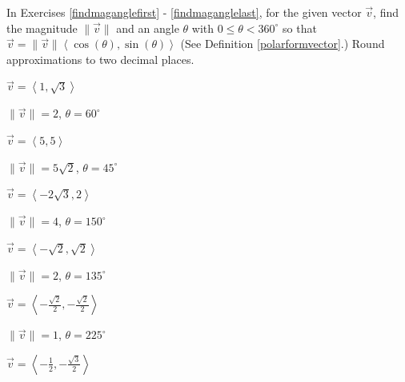 \documentclass{ximera}
\begin{document}
\begin{question}
In Exercises \ref{findmaganglefirst} - \ref{findmaganglelast}, for the given vector $\overrightarrow{v}$, find the magnitude $\|\overrightarrow{v}\|$ and an angle $\theta$ with $0 \leq \theta < 360^{\circ}$ so that $\overrightarrow{v} = \|\overrightarrow{v}\| \left<\cos(\theta), \sin(\theta) \right>$ (See Definition \ref{polarformvector}.)  Round approximations to two decimal places.

\begin{problem} \label{findmaganglefirst} 
$\overrightarrow{v} = \left<1,\sqrt{3}\right>$

\begin{solution}
$\|\overrightarrow{v}\| = 2$, $\theta = 60^{\circ}$
\end{solution}
\end{problem}

\begin{problem}
$\overrightarrow{v} = \left<5,5\right>$

\begin{solution}
$\|\overrightarrow{v}\| = 5\sqrt{2}$, $\theta = 45^{\circ}$
\end{solution}
\end{problem}

\begin{problem}
$\overrightarrow{v} = \left<-2\sqrt{3}, 2 \right>$

\begin{solution}
$\|\overrightarrow{v}\| = 4$, $\theta = 150^{\circ}$
\end{solution}
\end{problem}

\begin{problem}
$\overrightarrow{v} = \left<-\sqrt{2}, \sqrt{2} \right>$

\begin{solution}
$\|\overrightarrow{v}\| = 2$, $\theta = 135^{\circ}$
\end{solution}
\end{problem}

\begin{problem}
$\overrightarrow{v} = \left<-\frac{\sqrt{2}}{2}, -\frac{\sqrt{2}}{2}\right>$

\begin{solution}
$\|\overrightarrow{v}\| = 1$, $\theta = 225^{\circ}$
\end{solution}
\end{problem}

\begin{problem}
$\overrightarrow{v} = \left<-\frac{1}{2}, -\frac{\sqrt{3}}{2}  \right>$


\end{problem}
\end{question}
\end{document}
